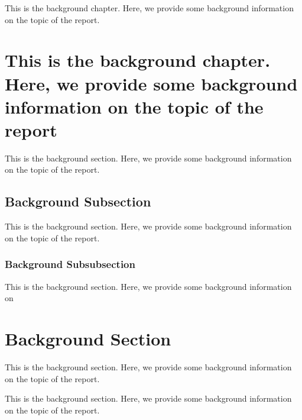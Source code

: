 \documentclass{report}
\begin{document}
This is the background chapter. Here, we provide some background information on the topic of the report.

\section{This is the background chapter. Here, we provide some background information on the topic of the report}
This is the background section. Here, we provide some background information on
the topic of the report.

\subsection{Background Subsection}
This is the background section. Here, we provide some background information on
the topic of the report.
\subsubsection{Background Subsubsection}
This is the background section. Here, we provide some background information on

\section{Background Section}
This is the background section. Here, we provide some background information on
the topic of the report.

This is the background section. Here, we provide some background information on
the topic of the report.
\end{document}
